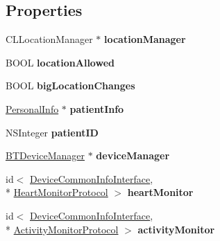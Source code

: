 \subsection*{Properties}
\begin{DoxyCompactItemize}
\item 
\hypertarget{interface_device_poll_manager_ad710c38392bfc32d3509de470e0cfa8d}{C\-L\-Location\-Manager $\ast$ {\bfseries location\-Manager}}\label{interface_device_poll_manager_ad710c38392bfc32d3509de470e0cfa8d}

\item 
\hypertarget{interface_device_poll_manager_a0e9aad6cc4f5a99aff27b0a64ae76d19}{B\-O\-O\-L {\bfseries location\-Allowed}}\label{interface_device_poll_manager_a0e9aad6cc4f5a99aff27b0a64ae76d19}

\item 
\hypertarget{interface_device_poll_manager_a8186f40fc585c1bf30ebb8c6e05ca6d4}{B\-O\-O\-L {\bfseries big\-Location\-Changes}}\label{interface_device_poll_manager_a8186f40fc585c1bf30ebb8c6e05ca6d4}

\item 
\hypertarget{interface_device_poll_manager_a8739ffcaa2b1e02afc1864e338de148f}{\hyperlink{interface_personal_info}{Personal\-Info} $\ast$ {\bfseries patient\-Info}}\label{interface_device_poll_manager_a8739ffcaa2b1e02afc1864e338de148f}

\item 
\hypertarget{interface_device_poll_manager_a621e3962372201145248997e2eb87327}{N\-S\-Integer {\bfseries patient\-I\-D}}\label{interface_device_poll_manager_a621e3962372201145248997e2eb87327}

\item 
\hypertarget{interface_device_poll_manager_a813e014763804b71e247ca335fe91761}{\hyperlink{interface_b_t_device_manager}{B\-T\-Device\-Manager} $\ast$ {\bfseries device\-Manager}}\label{interface_device_poll_manager_a813e014763804b71e247ca335fe91761}

\item 
\hypertarget{interface_device_poll_manager_a5d06bcab588b72afdf5fce4c102afe91}{id$<$ \hyperlink{protocol_device_common_info_interface-p}{Device\-Common\-Info\-Interface}, \\*
\hyperlink{protocol_heart_monitor_protocol-p}{Heart\-Monitor\-Protocol} $>$ {\bfseries heart\-Monitor}}\label{interface_device_poll_manager_a5d06bcab588b72afdf5fce4c102afe91}

\item 
\hypertarget{interface_device_poll_manager_a1e33e8f7da83c22dccb6c3b3b7d66069}{id$<$ \hyperlink{protocol_device_common_info_interface-p}{Device\-Common\-Info\-Interface}, \\*
\hyperlink{protocol_activity_monitor_protocol-p}{Activity\-Monitor\-Protocol} $>$ {\bfseries activity\-Monitor}}\label{interface_device_poll_manager_a1e33e8f7da83c22dccb6c3b3b7d66069}


\end{DoxyCompactItemize}

